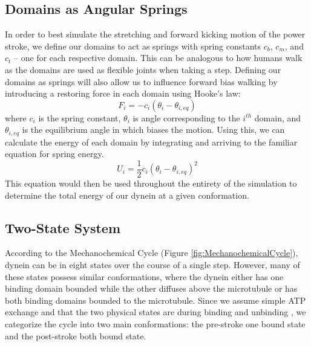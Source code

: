 \subsection{Domains as Angular Springs}
In order to best simulate the stretching and forward kicking motion of the power stroke, we define our domains to act as springs with spring constants $c_b$, $c_m$, and $c_t$ -- one for each respective domain. This can be analogous to how humans walk as the domains are used as flexible joints when taking a step. Defining our domains as springs will also allow us to influence forward bias walking by introducing a restoring force in each domain using Hooke's law: 
\begin{equation}
    F_i=-c_i(\theta_i-\theta_{i,eq})
\end{equation}
where $c_i$ is the spring constant, $\theta_i$ is angle corresponding to the $i^{th}$ domain, and $\theta_{i,eq}$ is the equilibrium angle in which biases the motion. Using this, we can calculate the energy of each domain by integrating and arriving to the familiar equation for spring energy.
\begin{equation}
    U_i=\frac{1}{2}c_i(\theta_i-\theta_{i,eq})^2
\end{equation}
This equation would then be used throughout the entirety of the simulation to determine the total energy of our dynein at a given conformation. 


\subsection{Two-State System}
According to the Mechanochemical Cycle (Figure \ref{fig:MechanochemicalCycle}), dynein can be in eight states over the course of a single step. However, many of these states possess similar conformations, where the dynein either has one binding domain bounded while the other diffuses above the microtubule or has both binding domains bounded to the microtubule. Since we assume simple ATP exchange and that the two physical states are during binding and unbinding \cite{}, we categorize the cycle into two main conformations: the pre-stroke one bound state and the post-stroke both bound state.

